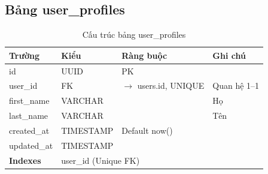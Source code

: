 \documentclass[12pt,a4paper]{article}
\begin{document}
\subsection{Bảng user\_profiles}
\begin{longtable}{|l|l|l|p{5.5cm}|}
    \caption{Cấu trúc bảng user\_profiles}                                             \\
    \hline
    \rowcolor{headerblue}
    \textbf{Trường} & \textbf{Kiểu} & \textbf{Ràng buộc}             & \textbf{Ghi chú} \\
    \hline
    id              & UUID          & PK                             &                  \\
    \hline
    user\_id        & FK            & $\rightarrow$ users.id, UNIQUE & Quan hệ 1--1     \\
    \hline
    first\_name     & VARCHAR       &                                & Họ               \\
    \hline
    last\_name      & VARCHAR       &                                & Tên              \\
    \hline
    created\_at     & TIMESTAMP     & Default now()                  &                  \\
    \hline
    updated\_at     & TIMESTAMP     &                                &                  \\
    \hline
    \rowcolor{headerblue}
    \textbf{Indexes} & \multicolumn{3}{l|}{user\_id (Unique FK)}                            \\
    \hline
\end{longtable}
\end{document}

